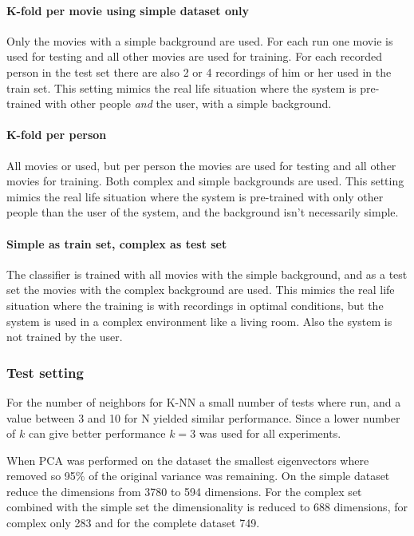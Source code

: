 \paragraph{K-fold per movie using simple dataset only}
Only the movies with a simple background are used. For each run one movie is used for testing and all other movies are used for training. For each recorded person in the test set there are also 2 or 4 recordings of him or her used in the train set. This setting mimics the real life situation where the system is pre-trained with other people \emph{and} the user, with a simple background.

\paragraph{K-fold per person}
All movies or used, but per person the movies are used for testing and all other movies for training. Both complex and simple backgrounds are used. This setting mimics the real life situation where the system is pre-trained with only other people than the user of the system, and the background isn't necessarily simple. 

\paragraph{Simple as train set, complex as test set}
The classifier is trained with all movies with the simple background, and as a test set the movies with the complex background are used. This mimics the real life situation where the training is with recordings in optimal conditions, but the system is used in a complex environment like a living room. Also the system is not trained by the user.


\subsubsection{Test setting}
For the number of neighbors for K-NN a small number of tests where run, and a value between 3 and 10 for N yielded similar performance. Since a lower number of $k$ can give better performance $k=3$ was used for all experiments.

When PCA was performed on the dataset the smallest eigenvectors where removed so 95\% of the original variance was remaining. On the simple dataset reduce the dimensions from 3780 to 594 dimensions. For the complex set combined with the simple set the dimensionality is reduced to 688 dimensions, for complex only 283 and for the complete dataset 749.

